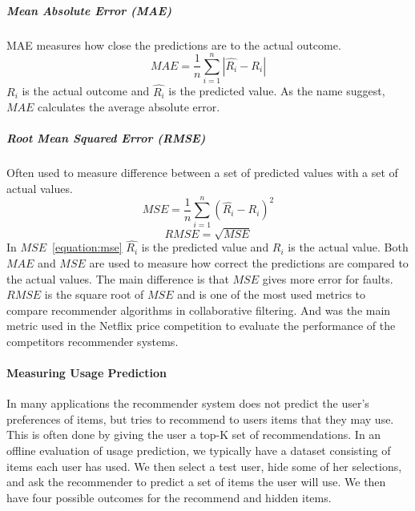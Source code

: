 \subparagraph{Mean Absolute Error (MAE)}
MAE measures how close the predictions are to the actual outcome.
\begin{equation}
    MAE = \frac{1}{n}\sum_{i=1}^{n}{|\hat{R_i}-R_i|}
    \label{equation:mae}
\end{equation}
$R_i$ is the actual outcome and $\hat{R_i}$ is the predicted value.
As the name suggest, $MAE$ calculates the average absolute error.

\subparagraph{Root Mean Squared Error (RMSE)}
Often used to measure difference between a set of predicted values with a set of actual values.
\begin{equation}
    MSE = \frac{1}{n}\sum_{i=1}^{n}{(\hat{R_i} - R_i)^{2}}
    \label{equation:mse}
\end{equation}
\begin{equation}
    RMSE = \sqrt{MSE}
    \label{equation:rmse}
\end{equation}
In $MSE$~\ref{equation:mse} $\hat{R_i}$ is the predicted value and $R_i$ is the actual value.
Both $MAE$ and $MSE$ are used to measure how correct the predictions are compared to the actual values.
The main difference is that $MSE$ gives more error for faults.
$RMSE$ is the square root of $MSE$ and is one of the most used metrics to compare recommender algorithms in collaborative filtering.
And was the main metric used in the Netflix price competition to evaluate the performance of the competitors recommender systems.




\paragraph{Measuring Usage Prediction}
In many applications the recommender system does not predict the user's
preferences of items, but tries to recommend to users items that they may use.
This is often done by giving the user a top-K set of recommendations.
In an offline evaluation of usage prediction, we typically have a dataset
consisting of items each user has used. We then select a test user, hide some
of her selections, and ask the recommender to predict a set of items the user
will use. We then have four possible outcomes for the recommend and hidden
items.

